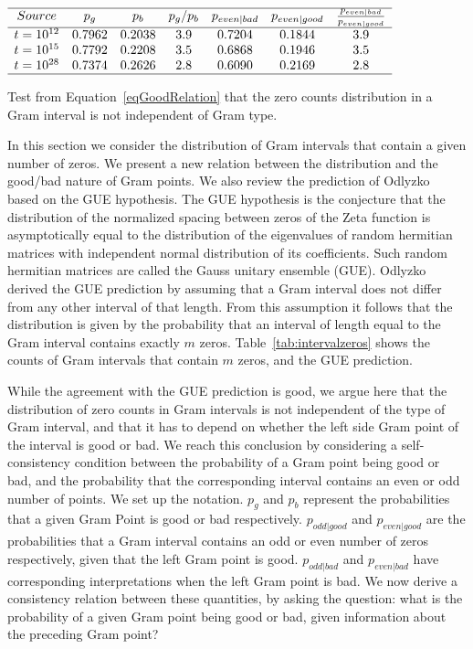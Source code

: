 \documentclass[twoside]{article}
\begin{document}
\begin{table}
\centering \(\begin{array}{ccccccc}
\hline
Source &p_g&p_b& p_g/p_b&p_{even|bad} &p_{even|good}&\frac{p_{even|bad}}{p_{even|good}}\\
\hline
t = 10^{12}&0.7962&0.2038&3.9&0.7204&0.1844&3.9\\
t = 10^{15}&0.7792&0.2208&3.5&0.6868&0.1946&3.5\\
t = 10^{28}&0.7374&0.2626&2.8&0.6090&0.2169&2.8\\
\hline
\end{array}\)
\caption{Test from  Equation~\ref{eqGoodRelation} that the zero counts distribution in a Gram interval is not independent of Gram type.} \label{tab:pevenpred}
\end{table}

In this section we consider the distribution of Gram intervals that contain a given number of zeros. We present a new relation between the distribution and the good/bad nature of Gram points. We also review the prediction of Odlyzko~\cite{Odlyzko 1992} based on the GUE hypothesis. The GUE hypothesis  is the conjecture that the distribution of the normalized spacing between zeros of the Zeta function is asymptotically equal to the distribution of the eigenvalues of random hermitian matrices with independent normal distribution of its coefficients. Such random hermitian matrices are called the Gauss unitary ensemble (GUE).  Odlyzko derived the GUE prediction by assuming that a Gram interval does not differ from any other interval of that length. From this assumption it follows that the distribution is given by the probability that an interval of length equal to the Gram interval contains exactly $m$ zeros. Table~\ref{tab:intervalzeros} shows the counts of Gram intervals that contain $m$ zeros, and the GUE prediction.

While the agreement with the GUE prediction is good, we argue here that the distribution of zero counts in Gram intervals is not independent of the type of Gram interval, and that it has to depend on whether the left side Gram point of the interval is good or bad. We reach this conclusion by considering a self-consistency condition between the probability of a Gram point being good or bad, and the probability that the corresponding interval contains an even or odd number of points.  We set up the notation. $p_g$ and $p_b$ represent the probabilities that a given Gram Point is good or bad respectively.  $p_{odd|good}$ and $p_{even|good}$ are the probabilities that a Gram interval contains an odd or even number of zeros respectively, given that the left Gram point is good. $p_{odd|bad}$ and $p_{even|bad}$ have corresponding interpretations when the left Gram point is bad. We now derive a consistency relation between these quantities, by asking the question: what is the probability of a given Gram point being good or bad, given information about the preceding Gram point? 
\end{document}

